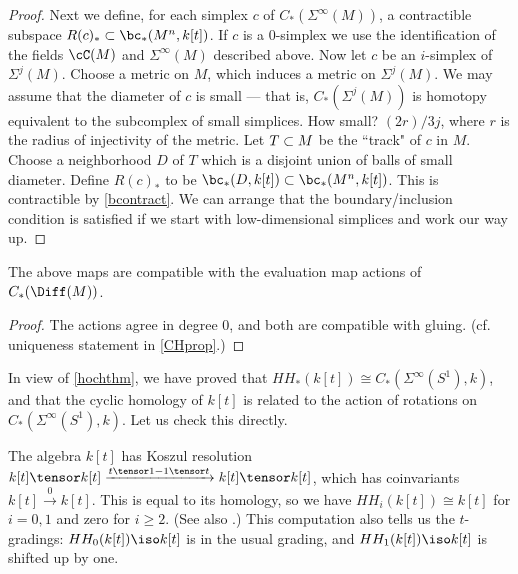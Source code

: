 \begin{proof}
Next we define, for each simplex $c$ of $C_*(\Sigma^\infty(M))$, a contractible subspace
$R(c)_* \sub \bc_*(M^n, k[t])$.
If $c$ is a 0-simplex we use the identification of the fields $\cC(M)$ and 
$\Sigma^\infty(M)$ described above.
Now let $c$ be an $i$-simplex of $\Sigma^j(M)$.
Choose a metric on $M$, which induces a metric on $\Sigma^j(M)$.
We may assume that the diameter of $c$ is small --- that is, $C_*(\Sigma^j(M))$
is homotopy equivalent to the subcomplex of small simplices.
How small?  $(2r)/3j$, where $r$ is the radius of injectivity of the metric.
Let $T\subset M$ be the ``track" of $c$ in $M$.
Choose a neighborhood $D$ of $T$ which is a disjoint union of balls of small diameter.
Define $R(c)_*$ to be $\bc_*(D, k[t]) \sub \bc_*(M^n, k[t])$.
This is contractible by \ref{bcontract}.
We can arrange that the boundary/inclusion condition is satisfied if we start with
low-dimensional simplices and work our way up.

\end{proof}


\begin{prop} \label{ktchprop}
The above maps are compatible with the evaluation map actions of $C_*(\Diff(M))$.
\end{prop}

\begin{proof}
The actions agree in degree 0, and both are compatible with gluing.
(cf. uniqueness statement in \ref{CHprop}.)
\end{proof}

\medskip

In view of \ref{hochthm}, we have proved that $HH_*(k[t]) \cong C_*(\Sigma^\infty(S^1), k)$,
and that the cyclic homology of $k[t]$ is related to the action of rotations
on $C_*(\Sigma^\infty(S^1), k)$.
Let us check this directly.

The algebra $k[t]$ has Koszul resolution 
$k[t] \tensor k[t] \xrightarrow{t\tensor 1 - 1 \tensor t} k[t] \tensor k[t]$, 
which has coinvariants $k[t] \xrightarrow{0} k[t]$. 
This is equal to its homology, so we have $HH_i(k[t]) \cong k[t]$ for $i=0,1$ and zero for $i\ge 2$.
(See also  \cite[3.2.2]{MR1600246}.) This computation also tells us the $t$-gradings: 
$HH_0(k[t]) \iso k[t]$ is in the usual grading, and $HH_1(k[t]) \iso k[t]$ is shifted up by one.

